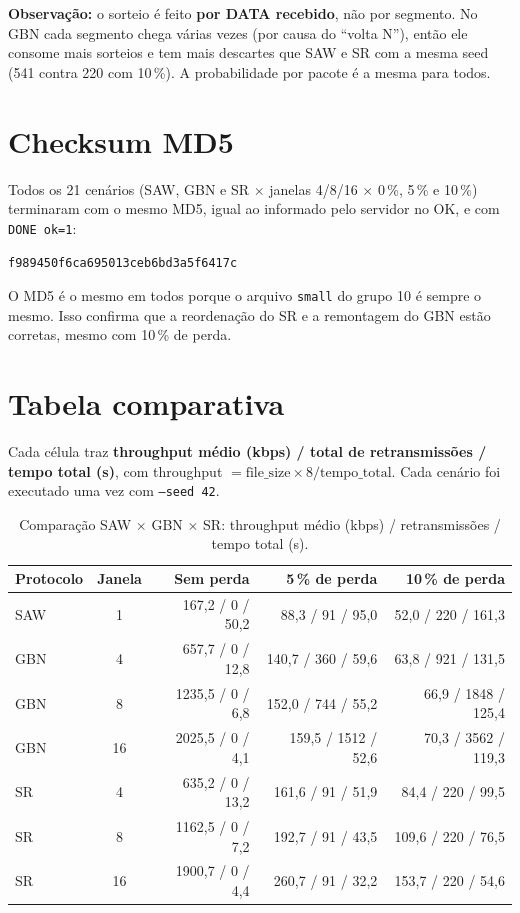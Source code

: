 \documentclass[11pt,a4paper]{article}
\newcommand{\cod}[1]{\textcolor{codverde}{\texttt{\small #1}}}
\begin{document}
\textbf{Observação:} o sorteio é feito \textbf{por DATA recebido}, não por segmento. No GBN cada segmento chega várias vezes (por causa do ``volta N''), então ele consome mais sorteios e tem mais descartes que SAW e SR com a mesma seed (541 contra 220 com 10\,\%). A probabilidade por pacote é a mesma para todos.

\section{Checksum MD5}\label{sec:md5}

Todos os 21 cenários (SAW, GBN e SR $\times$ janelas 4/8/16 $\times$ 0\,\%, 5\,\% e 10\,\%) terminaram com o mesmo MD5, igual ao informado pelo servidor no OK, e com \cod{DONE ok=1}:
\begin{center}
\cod{f989450f6ca695013ceb6bd3a5f6417c}
\end{center}
O MD5 é o mesmo em todos porque o arquivo \cod{small} do grupo 10 é sempre o mesmo. Isso confirma que a reordenação do SR e a remontagem do GBN estão corretas, mesmo com 10\,\% de perda.

\section{Tabela comparativa}

Cada célula traz \textbf{throughput médio (kbps) / total de retransmissões / tempo total (s)}, com throughput $= \text{file\_size} \times 8 / \text{tempo\_total}$. Cada cenário foi executado uma vez com \cod{--seed 42}.

\begin{table}[ht]
\centering\small
\begin{tabular}{@{}l c r r r@{}}
\toprule
\textbf{Protocolo} & \textbf{Janela} & \textbf{Sem perda} & \textbf{5\,\% de perda} & \textbf{10\,\% de perda}\\
\midrule
SAW & 1  & 167,2 / 0 / 50,2   & 88,3 / 91 / 95,0    & 52,0 / 220 / 161,3\\
\midrule
GBN & 4  & 657,7 / 0 / 12,8   & 140,7 / 360 / 59,6  & 63,8 / 921 / 131,5\\
GBN & 8  & 1235,5 / 0 / 6,8   & 152,0 / 744 / 55,2  & 66,9 / 1848 / 125,4\\
GBN & 16 & 2025,5 / 0 / 4,1   & 159,5 / 1512 / 52,6 & 70,3 / 3562 / 119,3\\
\midrule
SR  & 4  & 635,2 / 0 / 13,2   & 161,6 / 91 / 51,9   & 84,4 / 220 / 99,5\\
SR  & 8  & 1162,5 / 0 / 7,2   & 192,7 / 91 / 43,5   & 109,6 / 220 / 76,5\\
SR  & 16 & 1900,7 / 0 / 4,4   & 260,7 / 91 / 32,2   & 153,7 / 220 / 54,6\\
\bottomrule
\end{tabular}
\caption{Comparação SAW $\times$ GBN $\times$ SR: throughput médio (kbps) / retransmissões / tempo total (s).}
\label{tab:comparativa}
\end{table}
\end{document}
